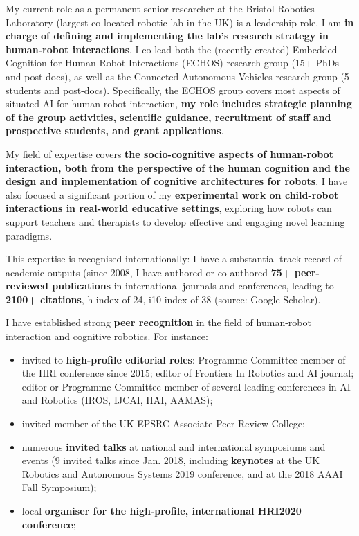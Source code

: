 \documentclass[11pt]{report}
\begin{document}
My current role as a permanent senior researcher at the Bristol Robotics
Laboratory (largest co-located robotic lab in the UK) is a leadership role. I am
\textbf{in charge of defining and implementing the lab's research strategy in
human-robot interactions}. I co-lead both the (recently created) Embedded
Cognition for Human-Robot Interactions (ECHOS) research group (15+ PhDs and
post-docs), as well as the Connected Autonomous Vehicles research group (5
students and post-docs). Specifically, the ECHOS group covers most aspects of
situated AI for human-robot interaction, \textbf{my role includes strategic
planning of the group activities, scientific guidance, recruitment of staff and
prospective students, and grant applications}.

My field of expertise covers \textbf{the socio-cognitive aspects of
human-robot interaction, both from the perspective of the human cognition and
the design and implementation of cognitive architectures for robots}. I have
also focused a significant portion of my \textbf{experimental work on
child-robot interactions in real-world educative settings}, exploring how robots
can support teachers and therapists to develop effective and engaging novel
learning paradigms.

This expertise is recognised internationally: I have a substantial track record
of academic outputs (since 2008, I have authored or co-authored \textbf{75+ peer-reviewed
publications} in international journals and conferences, leading to \textbf{2100+
citations}, h-index of 24, i10-index of 38 (source: Google Scholar).

I have established strong \textbf{peer recognition} in the field of human-robot interaction
and cognitive robotics. For instance:

\begin{itemize}[noitemsep,topsep=0pt,parsep=0pt,partopsep=0pt]
    \item invited to \textbf{high-profile editorial roles}: Programme Committee member of the HRI
conference since 2015; editor of Frontiers In Robotics and AI journal; editor or
Programme Committee member of several leading conferences in AI and Robotics (IROS, IJCAI, HAI, AAMAS);
    \item invited member of the UK EPSRC Associate Peer Review College;
    \item numerous \textbf{invited talks} at national and international symposiums and
        events (9 invited talks since Jan. 2018, including \textbf{keynotes} at the UK Robotics
and Autonomous Systems 2019 conference, and at the 2018 AAAI Fall Symposium);
    \item local \textbf{organiser for the high-profile, international HRI2020
        conference};
\end{itemize}
\end{document}
